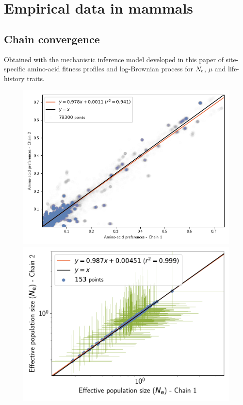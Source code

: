 \documentclass{article}
\begin{document}
	\section{Empirical data in mammals}
	\label{sec:empirical-data-in-mammals}

	\subsection{Chain convergence}
	\label{subsec:chain-convergence}
	Obtained with the mechanistic inference model developed in this paper of site-specific amino-acid fitness profiles and log-Brownian process for $N_{\text{e}}$, $\mu$ and life-history traits.

	\begin{figure}[H]
		\centering
		\begin{minipage}{0.49\linewidth}
			\includegraphics[width=\linewidth, page=1]{mammals/18CDS_SiteMutSelBranchNe_R1_ProfileCorrelation.png}
		\end{minipage} \hfill
		\begin{minipage}{0.49\linewidth}
			\includegraphics[width=\linewidth, page=1]{mammals/18CDS_SiteMutSelBranchNe_R1_LogPopulationSizeCorrelation}

\end{minipage}
\end{figure}
\end{document}
